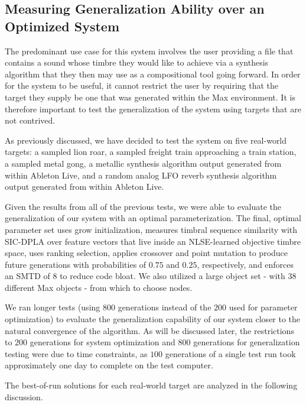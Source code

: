 \documentclass[12pt]{report} 	%
\numberwithin{figure}{chapter}
\numberwithin{table}{chapter}
\numberwithin{equation}{chapter}
\begin{document}
\begin{flushleft}
\vspace{12pt}\section{Measuring Generalization Ability over an Optimized System}
The predominant use case for this system involves the user providing a file that contains a sound whose timbre they would like to achieve via a synthesis algorithm that they then may use as a compositional tool going forward. In order for the system to be useful, it cannot restrict the user by requiring that the target they supply be one that was generated within the Max environment. It is therefore important to test the generalization of the system using targets that are not contrived.

As previously discussed, we have decided to test the system on five real-world targets: a sampled lion roar, a sampled freight train approaching a train station, a sampled metal gong, a metallic synthesis algorithm output generated from within Ableton Live, and a random analog LFO reverb synthesis algorithm output generated from within Ableton Live.

Given the results from all of the previous tests, we were able to evaluate the generalization of our system with an optimal parameterization. The final, optimal parameter set uses grow initialization, measures timbral sequence similarity with SIC-DPLA over feature vectors that live inside an NLSE-learned objective timbre space, uses ranking selection, applies crossover and point mutation to produce future generations with probabilities of $0.75$ and $0.25$, respectively, and enforces an SMTD of $8$ to reduce code bloat. We also utilized a large object set - with $38$ different Max objects - from which to choose nodes.

We ran longer tests (using $800$ generations instead of the $200$ used for parameter optimization) to evaluate the generalization capability of our system closer to the natural convergence of the algorithm. As will be discussed later, the restrictions to $200$ generations for system optimization and $800$ generations for generalization testing were due to time constraints, as $100$ generations of a single test run took approximately one day to complete on the test computer. 

The best-of-run solutions for each real-world target are analyzed in the following discussion.

\vspace{12pt}

\end{flushleft}
\end{document}
